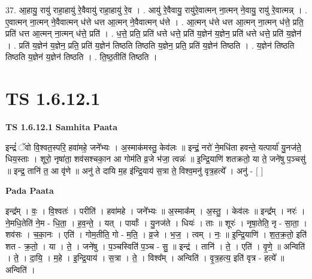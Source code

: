 \documentclass[17pt]{extarticle}
\begin{document}
37. आ॒हायु॒ रायु॑ राहा॒हायु॑ रे॒वैवायु॑ राहा॒हायु॑ रे॒व । . आयु॑ रे॒वैवायु॒ रायु॑रे॒वात्मन् ना॒त्मन् ने॒वायु॒ रायु॑ रे॒वात्मन्न् । . ए॒वात्मन् ना॒त्मन् ने॒वैवात्मन् ध॑त्ते धत्त आ॒त्मन् ने॒वैवात्मन् ध॑त्ते । . आ॒त्मन् ध॑त्ते धत्त आ॒त्मन् ना॒त्मन् ध॑त्ते॒ प्रति॒ प्रति॑ धत्त आ॒त्मन् ना॒त्मन् ध॑त्ते॒ प्रति॑ । . ध॒त्ते॒ प्रति॒ प्रति॑ धत्ते धत्ते॒ प्रति॑ य॒ज्ञेन॑ य॒ज्ञेन॒ प्रति॑ धत्ते धत्ते॒ प्रति॑ य॒ज्ञेन॑ । . प्रति॑ य॒ज्ञेन॑ य॒ज्ञेन॒ प्रति॒ प्रति॑ य॒ज्ञेन॑ तिष्ठति तिष्ठति य॒ज्ञेन॒ प्रति॒ प्रति॑ य॒ज्ञेन॑ तिष्ठति । . य॒ज्ञेन॑ तिष्ठति तिष्ठति य॒ज्ञेन॑ य॒ज्ञेन॑ तिष्ठति । . ति॒ष्ठ॒तीति॑ तिष्ठति । \newline
\pagebreak
{}
\section*{ TS 1.6.12.1 }

\textbf{TS 1.6.12.1 } \newline
\textbf{Samhita Paata} \newline

इन्द्रं॑ ॅवो वि॒श्वत॒स्परि॒ हवा॑महे॒ जने᳚भ्यः । अ॒स्माक॑मस्तु॒ केव॑लः ॥ इन्द्रं॒ नरो॑ ने॒मधि॑ता हवन्ते॒ यत्पार्या॑ यु॒नज॑ते॒ धिय॒स्ताः । शूरो॒ नृषा॑ता॒ शव॑सश्चका॒न आ गोम॑ति व्र॒जे भ॑जा॒ त्वन्नः॑ ॥ इ॒न्द्रि॒याणि॑ शतक्रतो॒ या ते॒ जने॑षु प॒ञ्चसु॑ ॥ इन्द्र॒ तानि॑ त॒ आ वृ॑णे ॥ अनु॑ ते दायि म॒ह इ॑न्द्रि॒याय॑ स॒त्रा ते॒ विश्व॒मनु॑ वृत्र॒हत्ये᳚ । अनु॑ - [ ] \newline

\textbf{Pada Paata} \newline

इन्द्र᳚म् । वः॒ । वि॒श्वतः॑ । परीति॑ । हवा॑महे । जने᳚भ्यः ॥ अ॒स्माक᳚म् । अ॒स्तु॒ । केव॑लः ॥ इन्द्र᳚म् । नरः॑ । ने॒मधि॒तेति॑ ने॒म - धि॒ता॒ । ह॒व॒न्ते॒ । यत् । पार्याः᳚ । यु॒नज॑ते । धियः॑ । ताः ॥ शूरः॑ । नृषा॒तेति॒ नृ - सा॒ता॒ । शव॑सः । च॒का॒नः । एति॑ । गोम॒तीति॒ गो - म॒ति॒ । व्र॒जे । भ॒ज॒ । त्वम् । नः॒ ॥ इ॒न्द्रि॒याणि॑ । श॒त॒क्र॒तो॒ इति॑ शत - क्र॒तो॒ । या । ते॒ । जने॑षु । प॒ञ्चस्विति॑॑ प॒ञ्च - सु॒ ॥ इन्द्र॑ । तानि॑ । ते॒ । एति॑ । वृ॒णे॒ ॥ अन्विति॑ । ते॒ । दा॒यि॒ । म॒हे । इ॒न्द्रि॒याय॑ । स॒त्रा । ते॒ । विश्व᳚म् । अन्विति॑ । वृ॒त्र॒हत्य॒ इति॑ वृत्र - हत्ये᳚ ॥ अन्विति॑ ।  \newline
\end{document}

